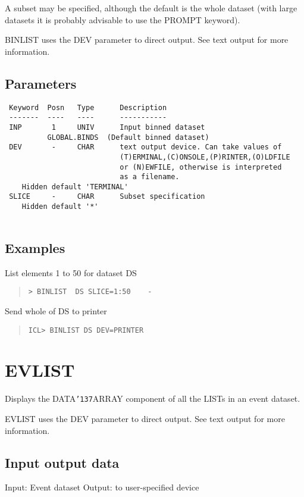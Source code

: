 \documentclass{book}
\renewcommand{\_}{{\tt\char'137}}     %
\begin{document}
A subset may be specified, although the default is the whole
dataset (with large datasets it is probably advisable to use the
PROMPT keyword).
 
BINLIST uses the DEV parameter to direct output. See text output
for more information.
 
\subsection{Parameters}
\begin{verbatim}
 Keyword  Posn   Type      Description
 -------  ----   ----      -----------
 INP       1     UNIV      Input binned dataset
          GLOBAL.BINDS  (Default binned dataset)
 DEV       -     CHAR      text output device. Can take values of
                           (T)ERMINAL,(C)ONSOLE,(P)RINTER,(O)LDFILE
                           or (N)EWFILE, otherwise is interpreted
                           as a filename.
    Hidden default 'TERMINAL'
 SLICE     -     CHAR      Subset specification
    Hidden default '*'
 
\end{verbatim}\subsection{Examples}
List elements 1 to 50 for dataset DS
\begin{quote}\begin{verbatim}
> BINLIST  DS SLICE=1:50    -
\end{verbatim}\end{quote}
Send whole of DS to printer
\begin{quote}\begin{verbatim}
ICL> BINLIST DS DEV=PRINTER
\end{verbatim}\end{quote}
\section{EVLIST}
Displays the DATA\_ARRAY component of all the LISTs in an event
dataset.
 
EVLIST uses the DEV parameter to direct output. See text output
for more information.
 
\subsection{Input output data}
Input: Event dataset
Output: to user-specified device
\end{document}
